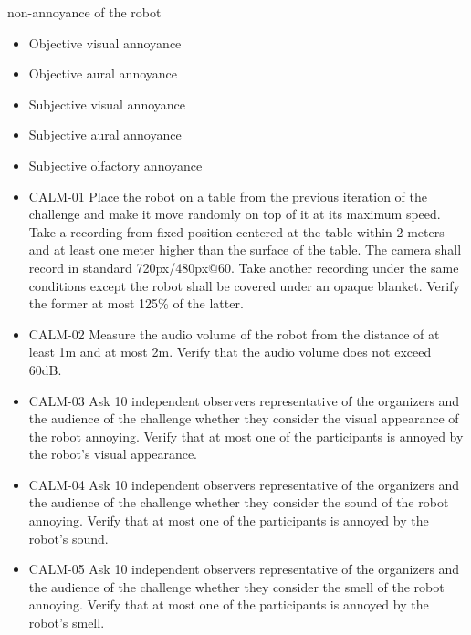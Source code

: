 \begin{itemize}
        {non-annoyance of the robot}
        {
            \begin{itemize}
                \item Objective visual annoyance
                \item Objective aural annoyance
                \item Subjective visual annoyance
                \item Subjective aural annoyance
                \item Subjective olfactory annoyance
            \end{itemize}
        }
        {
            \begin{itemize}
                \item CALM-01 \quad Place the robot on a table from the previous iteration of the challenge and make it move randomly on top of it at its maximum speed. Take a recording from fixed position centered at the table within 2 meters and at least one meter higher than the surface of the table. The camera shall record in standard 720px/480px@60. Take another recording under the same conditions except the robot shall be covered under an opaque blanket. Verify the former at most 125\% of the latter.
                \item CALM-02 \quad Measure the audio volume of the robot from the distance of at least 1m and at most 2m. Verify that the audio volume does not exceed 60dB.
                \item CALM-03 \quad Ask 10 independent observers representative of the organizers and the audience of the challenge whether they consider the visual appearance of the robot annoying. Verify that at most one of the participants is annoyed by the robot's visual appearance.
                \item CALM-04 \quad Ask 10 independent observers representative of the organizers and the audience of the challenge whether they consider the sound of the robot annoying. Verify that at most one of the participants is annoyed by the robot's sound.
                \item CALM-05 \quad Ask 10 independent observers representative of the organizers and the audience of the challenge whether they consider the smell of the robot annoying. Verify that at most one of the participants is annoyed by the robot's smell.
            \end{itemize}
        }


\end{itemize}
